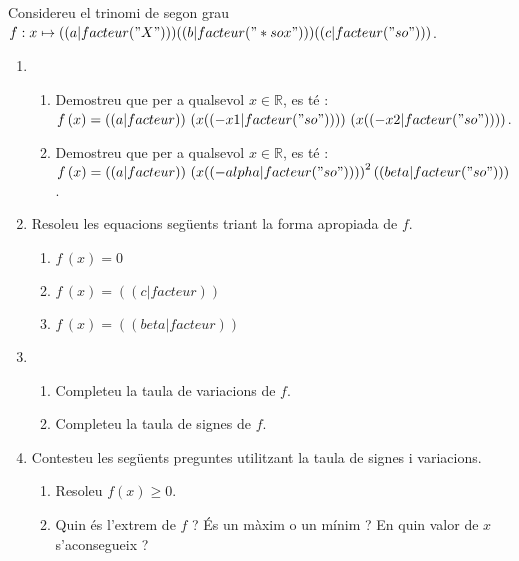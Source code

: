 \exercice
Considereu el trinomi de segon grau $f: x\mapsto (( a|facteur("X") )) (( b|facteur("*sox") )) (( c|facteur("so") ))$.

\begin{enumerate}
\item
\begin{enumerate}
    \item Demostreu que per a qualsevol $x\in\mathbb{R}$, es té : $f\,(x)=(( a|facteur )) \,\left( x (( -x1|facteur("so") )) \right) \, \left( x (( -x2|facteur("so") )) \right) $.
    \item Demostreu que per a qualsevol $x\in\mathbb{R}$, es té : $f\,(x)=(( a|facteur )) \,\left( x (( -alpha|facteur("so") )) \right)^2 (( beta|facteur("so") ))$.
\end{enumerate}
\item Resoleu les equacions següents triant la forma apropiada de $f$.
\begin{enumerate}
\item $f\,(x)=0$
\item $f\,(x)=(( c|facteur ))$
\item $f\,(x)=(( beta|facteur ))$
\end{enumerate}
\item
\begin{enumerate}
\item Completeu la taula de variacions de $f$.
\item Completeu la taula de signes de $f$.
\end{enumerate}
\item Contesteu les següents preguntes utilitzant la taula de signes i variacions.
\begin{enumerate}
\item Resoleu $f(x)\geqslant0$.
\item Quin és l'extrem de $f$ ? És un màxim o un mínim ?  En quin valor de $x$ s'aconsegueix ?
\end{enumerate}
\end{enumerate}
